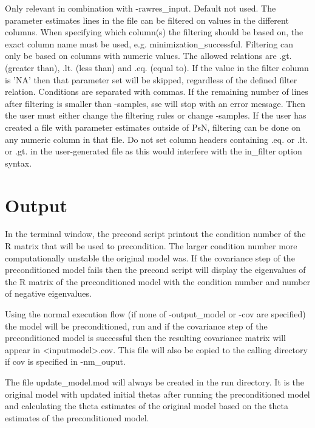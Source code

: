 \begin{optionlist}
Only relevant in combination with -rawres\_input. Default not used. The parameter estimates lines in the file can be filtered on values in the different columns. When specifying which column(s) the filtering should be based on, the exact column name must be used, e.g. minimization\_successful. Filtering can only be based on columns with numeric values. The allowed relations are .gt. (greater than), .lt. (less than) and .eq. (equal to). If the value in the filter column is 'NA' then that parameter set will be skipped, regardless of the defined filter relation. Conditions are separated with commas. If the remaining number of lines after filtering is smaller than -samples, sse will stop with an error message. Then the user must either change the filtering rules or change -samples. If the user has created a file with parameter estimates outside of PsN, filtering can be done on any numeric column in that file. Do not set column headers containing .eq. or .lt. or .gt. in the user-generated file as this would interfere with the in\_filter option syntax.
\nextopt
\end{optionlist}

\section{Output}
In the terminal window, the precond script printout the condition number of the R matrix that will be used to precondition.  The larger condition number more computationally unstable the original model was.  If the covariance step of the preconditioned model fails then the precond script will display the eigenvalues of the R matrix of the preconditioned model with the condition number and number of negative eigenvalues.  

Using the normal execution flow (if none of -output\_model or -cov are specified) the model will be preconditioned, run and if the covariance step of the preconditioned model is successful then the resulting covariance matrix will appear in <inputmodel>.cov. This file will also be copied to the calling
directory if cov is specified in -nm\_ouput.

The file update\_model.mod will always be created in the run directory. It is the original model with updated initial thetas after
running the preconditioned model and calculating the theta estimates of the original model based on the theta estimates of the preconditioned model.

